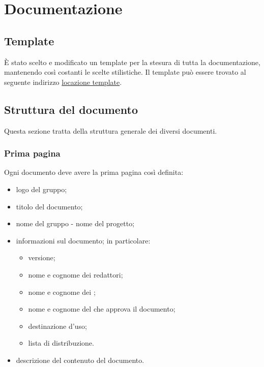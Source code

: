 \section{Documentazione}

\subsection{Template}
\`{E} stato scelto e modificato un template \glossario{\LaTeX{}} per la stesura di tutta la documentazione, mantenendo così costanti le scelte stilistiche. Il template può essere trovato al seguente indirizzo \url{locazione template}.

\subsection{Struttura del documento}
Questa sezione tratta della struttura generale dei diversi documenti.

\subsubsection{Prima pagina}
Ogni documento deve avere la prima pagina così definita:
\begin{itemize}
\item logo del gruppo;
\item titolo del documento;
\item nome del gruppo - nome del progetto;
\item informazioni sul documento; in particolare:
	\begin{itemize}
		\item versione;
		\item nome e cognome dei redattori;
		\item nome e cognome dei \Verificatori;
		\item nome e cognome del \Responsabile{} che approva il documento;
		\item destinazione d'uso;
		\item lista di distribuzione. 
	\end{itemize}
\item descrizione del contenuto del documento.
\end{itemize}

